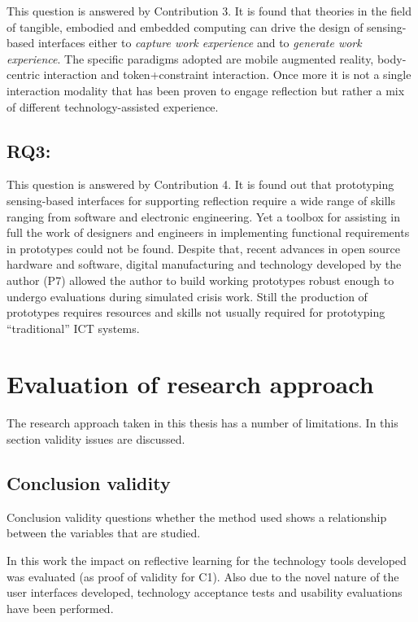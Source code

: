 This question is answered by Contribution 3. It is found that theories in the field of tangible, embodied and embedded computing can drive the design of sensing-based interfaces either to \emph{capture work experience} and to \emph{generate work experience}. The specific paradigms adopted are mobile augmented reality, body-centric interaction and token+constraint interaction. Once more it is not a single interaction modality that has been proven to engage reflection but rather a mix of different technology-assisted experience.

\subsection{RQ3: \RQiii}\label{rq3}

This question is answered by Contribution 4. It is found out that prototyping sensing-based interfaces for supporting reflection require a wide range of skills ranging from software and electronic engineering. Yet a toolbox for assisting in full the work of designers and engineers in implementing functional requirements in prototypes could not be found. Despite that, recent advances in open source hardware and software, digital manufacturing and technology developed by the author (P7) allowed the author to build working prototypes robust enough to undergo evaluations during simulated crisis work. Still the production of prototypes requires resources and skills not usually required for prototyping ``traditional'' ICT systems.

\section{Evaluation of research approach}\label{evaluation-of-research-approach}

The research approach taken in this thesis has a number of limitations. In this section validity issues are discussed.

\subsection{Conclusion validity}\label{conclusion-validity}

Conclusion validity questions whether the method used shows a relationship between the variables that are studied.

In this work the impact on reflective learning for the technology tools developed was evaluated (as proof of validity for C1). Also due to the novel nature of the user interfaces developed, technology acceptance tests and usability evaluations have been performed.

